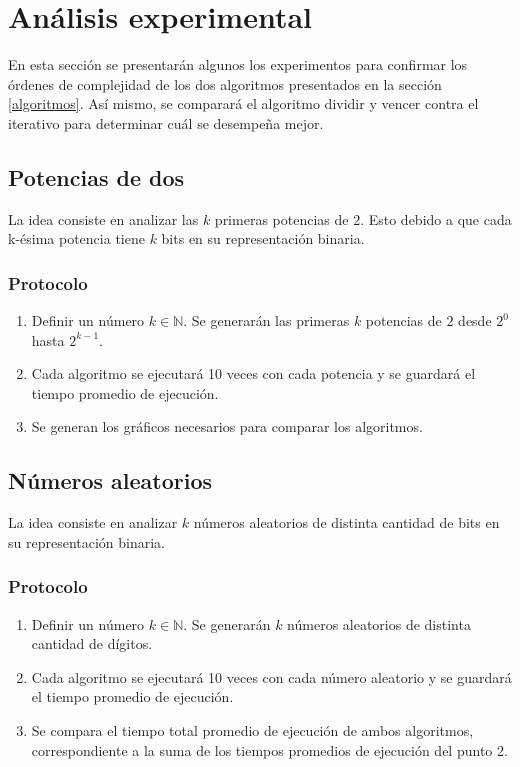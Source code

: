 \documentclass[letter]{article}
\begin{document}
\section{Análisis experimental} \label{experimentos}

En esta sección se presentarán algunos los experimentos para confirmar los órdenes de complejidad de los dos algoritmos presentados en la sección \ref{algoritmos}. Así mismo, se comparará el algoritmo dividir y vencer contra el iterativo para determinar cuál se desempeña mejor. \par

\subsection{Potencias de dos}

La idea consiste en analizar las $k$ primeras potencias de $2$. Esto debido a que cada k-ésima potencia tiene $k$ bits en su representación binaria. \par

\subsubsection{Protocolo}

\begin{enumerate}
    \item Definir un número $k \in\mathbb{N}$. Se generarán las primeras $k$ potencias de $2$ desde $2^0$ hasta $2^{k-1}$.
    \item Cada algoritmo se ejecutará 10 veces con cada potencia y se guardará el tiempo promedio de ejecución.
    \item Se generan los gráficos necesarios para comparar los algoritmos.
\end{enumerate}

\newpage

\subsection{Números aleatorios}

La idea consiste en analizar $k$ números aleatorios de distinta cantidad de bits en su representación binaria. \par

\subsubsection{Protocolo}

\begin{enumerate}
    \item Definir un número $k \in\mathbb{N}$. Se generarán $k$ números aleatorios de distinta cantidad de dígitos.
    \item Cada algoritmo se ejecutará 10 veces con cada número aleatorio y se guardará el tiempo promedio de ejecución.
    \item Se compara el tiempo total promedio de ejecución de ambos algoritmos, correspondiente a la suma de los tiempos promedios de ejecución del punto 2.
\end{enumerate}
\end{document}
